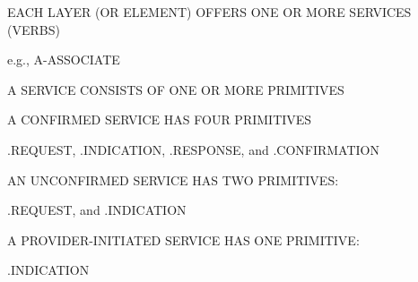 \begin{bwslide}

\begin{nrtc}
\item   EACH LAYER (OR ELEMENT) OFFERS ONE OR MORE SERVICES (VERBS)
    \begin{nrtc}
    \item       e.g., A-ASSOCIATE
    \end{nrtc}

\item   A SERVICE CONSISTS OF ONE OR MORE PRIMITIVES

\item   A CONFIRMED SERVICE HAS FOUR PRIMITIVES
    \begin{nrtc}
    \item       .REQUEST, .INDICATION, .RESPONSE, and .CONFIRMATION
    \end{nrtc}

\item   AN UNCONFIRMED SERVICE HAS TWO PRIMITIVES:
    \begin{nrtc}
    \item       .REQUEST,  and .INDICATION
    \end{nrtc}

\item   A PROVIDER-INITIATED SERVICE HAS ONE PRIMITIVE:
    \begin{nrtc}
    \item       .INDICATION
    \end{nrtc}
\end{nrtc}
\end{bwslide}




%


%


%


